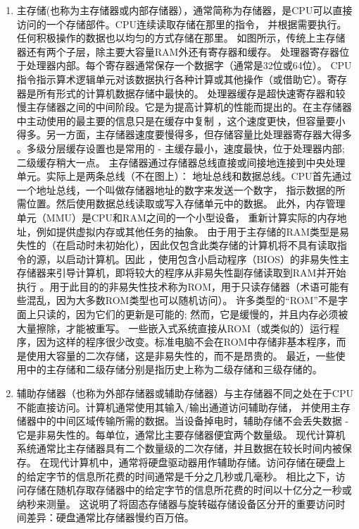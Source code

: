 \begin{enumerate}
	\item  主存储(也称为主存储器或内部存储器），通常简称为存储器，是CPU可以直接访问的一个存储部件。CPU连续读取存储在那里的指令，
	并根据需要执行。任何积极操作的数据也以均匀的方式存储在那里。
	如图所示，传统上主存储器还有两个子层，除主要大容量RAM外还有寄存器和缓存。
	处理器寄存器位于处理器内部。每个寄存器通常保存一个数据字（通常是32位或64位）。
	CPU指令指示算术逻辑单元对该数据执行各种计算或其他操作（或借助它）。寄存器是所有形式的计算机数据存储中最快的。
	处理器缓存是超快速寄存器和较慢主存储器之间的中间阶段。它是为提高计算机的性能而提出的。在主存储器中主动使用的最主要的信息只是在缓存中复制
	，这个速度更快，但容量要小得多。另一方面，主存储器速度要慢得多，但存储容量比处理器寄存器大得多
	。多级分层缓存设置也是常用的 - 主缓存最小，速度最快，位于处理器内部; 二级缓存稍大一点。
	主存储器通过存储器总线直接或间接地连接到中央处理单元。实际上是两条总线（不在图上）：
	地址总线和数据总线。CPU首先通过一个地址总线，一个叫做存储器地址的数字来发送一个数字，
	指示数据的所需位置。然后使用数据总线读取或写入存储单元中的数据。
	此外，内存管理单元（MMU）是CPU和RAM之间的一个小型设备，
	重新计算实际的内存地址，例如提供虚拟内存或其他任务的抽象。
	由于用于主存储的RAM类型是易失性的（在启动时未初始化），因此仅包含此类存储的计算机将不具有读取指令的源，以启动计算机。因此
	，使用包含小启动程序（BIOS）的非易失性主存储器来引导计算机，即将较大的程序从非易失性副存储读取到RAM并开始执行
	。用于此目的的非易失性技术称为ROM，用于只读存储器（术语可能有些混乱，因为大多数ROM类型也可以随机访问）。
	许多类型的“ROM”不是字面上只读的，因为它们的更新是可能的; 然而，它是缓慢的，并且内存必须被大量擦除，才能被重写。
	一些嵌入式系统直接从ROM（或类似的）运行程序，因为这样的程序很少改变。标准电脑不会在ROM中存储非基本程序，而是使用大容量的二次存储，这是非易失性的，而不是昂贵的。
	最近，一些使用中的主存储和二级存储分别是指历史上称为二级存储和三级存储的。
	\item   辅助存储器（也称为外部存储器或辅助存储器）与主存储器不同之处在于CPU不能直接访问。计算机通常使用其输入/输出通道访问辅助存储，
	并使用主存储器中的中间区域传输所需的数据。当设备掉电时，辅助存储不会丢失数据 - 它是非易失性的。每单位，通常比主要存储器便宜两个数量级。
	现代计算机系统通常比主存储器具有二个数量级的二次存储，并且数据在较长时间内被保存。
	在现代计算机中，通常将硬盘驱动器用作辅助存储。访问存储在硬盘上的给定字节的信息所花费的时间通常是千分之几秒或几毫秒。
	相比之下，访问存储在随机存取存储器中的给定字节的信息所花费的时间以十亿分之一秒或纳秒来测量。
	这说明了将固态存储器与旋转磁存储设备区分开的重要访问时间差异：硬盘通常比存储器慢约百万倍。

\end{enumerate}
